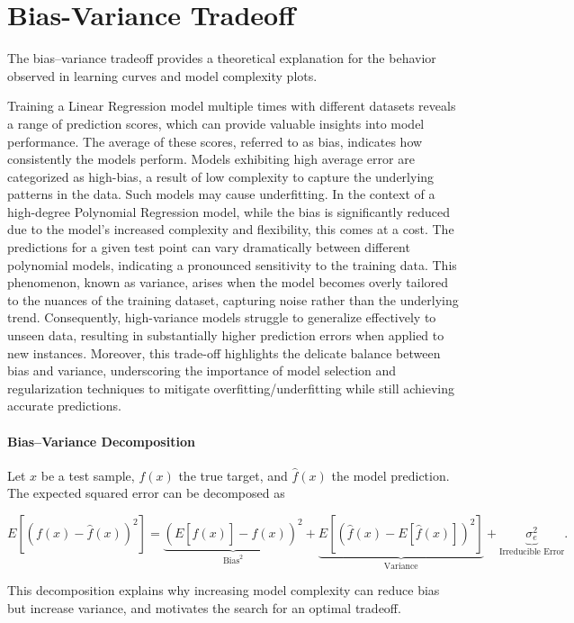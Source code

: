 \documentclass{article}
\begin{document}
\section{Bias-Variance Tradeoff}

The bias–variance tradeoff provides a theoretical explanation for the 
behavior observed in learning curves and model complexity plots.

Training a Linear Regression model multiple times with different datasets reveals a range of prediction scores, which can provide valuable insights into model performance. The average of these scores, referred to as bias, indicates how consistently the models perform. Models exhibiting high average error are categorized as high-bias, a result of low complexity to capture the underlying patterns in the data. Such models may cause underfitting. In the context of a high-degree Polynomial Regression model, while the bias is significantly reduced due to the model's increased complexity and flexibility, this comes at a cost. The predictions for a given test point can vary dramatically between different polynomial models, indicating a pronounced sensitivity to the training data. This phenomenon, known as variance, arises when the model becomes overly tailored to the nuances of the training dataset, capturing noise rather than the underlying trend. Consequently, high-variance models struggle to generalize effectively to unseen data, resulting in substantially higher prediction errors when applied to new instances. Moreover, this trade-off highlights the delicate balance between bias and variance, underscoring the importance of model selection and regularization techniques to mitigate overfitting/underfitting while still achieving accurate predictions.


\paragraph{Bias–Variance Decomposition}

Let $x$ be a test sample, $f(x)$ the true target, and $\hat{f}(x)$ the model prediction.
The expected squared error can be decomposed as

\[
E[(f(x) - \hat{f}(x))^2]
= \underbrace{(E[\hat{f}(x)] - f(x))^2}_{\text{Bias}^2}
+ \underbrace{E[(\hat{f}(x) - E[\hat{f}(x)])^2]}_{\text{Variance}}
+ \underbrace{\sigma_e^2}_{\text{Irreducible Error}}.
\]

This decomposition explains why increasing model complexity can reduce bias
but increase variance, and motivates the search for an optimal tradeoff.
\end{document}
